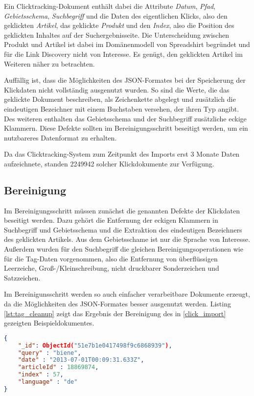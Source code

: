 Ein Clicktracking-Dokument enthält dabei die Attribute \emph{Datum}, \emph{Pfad}, \emph{Gebietsschema}, \emph{Suchbegriff} und die Daten des eigentlichen Klicks, also den geklickten \emph{Artikel}, das geklickte \emph{Produkt} und den \emph{Index}, also die Position des geklickten Inhaltes auf der Suchergebnisseite. Die Unterscheidung zwischen Produkt und Artikel ist dabei im Domänenmodell von Spreadshirt begründet und für die Link Discovery nicht von Interesse. Es genügt, den geklickten Artikel im Weiteren näher zu betrachten.

Auffällig ist, dass die Möglichkeiten des JSON-Formates bei der Speicherung der Klickdaten nicht vollständig ausgenutzt wurden. So sind die Werte, die das geklickte Dokument beschreiben, als Zeichenkette abgelegt und zusätzlich die eindeutigen Bezeichner mit einem Buchstaben versehen, der ihren Typ angibt. Des weiteren enthalten  das Gebietsschema und der Suchbegriff zusätzliche eckige Klammern. Diese Defekte sollten im Bereinigungsschritt beseitigt werden, um ein nutzbareres Datenformat zu erhalten.

Da das Clicktracking-System zum Zeitpunkt des Imports erst 3 Monate Daten aufzeichnete, standen \num{2249942} solcher Klickdokumente zur Verfügung.

\subsection{Bereinigung}

Im Bereinigungsschritt müssen zunächst die genannten Defekte der Klickdaten beseitigt werden. Dazu gehört die Entfernung der eckigen Klammern in Suchbegriff und Gebietsschema und die Extraktion des eindeutigen Bezeichners des geklickten Artikels. Aus dem Gebietsschame ist nur die Sprache von Interesse. Außerdem wurden für den Suchbegriff die gleichen Bereinigungsoperationen wie für die Tag-Daten vorgenommen, also die Entfernung von überflüssigen Leerzeiche, Groß-/Kleinschreibung, nicht druckbarer Sonderzeichen und Satzzeichen.

Im Bereinigunsschritt werden so auch einfacher verarbeitbare Dokumente erzeugt, da die Möglichkeiten des JSON-Formates besser ausgenutzt werden. Listing \ref{lst:tag_cleanup} zeigt das Ergebnis der Bereinigung des in \ref{click_import} gezeigten Beispieldokumentes.

\begin{lstlisting}[language=json, label={lst:tag_cleanup}, caption={Bereinigtes Clicktracking-Dokument}]
{
    "_id": ObjectId("51e7b1e0417498f9c6868939"),
    "query" : "biene",
    "date" : "2013-07-01T00:09:31.633Z",
    "articleId" : 18869874,
    "index" : 57,
    "language" : "de"
}
\end{lstlisting}

